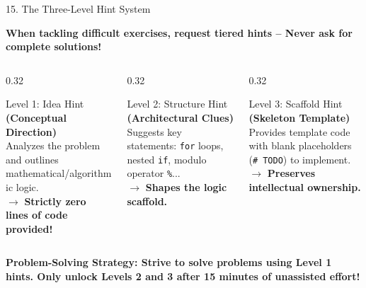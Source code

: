 \documentclass[aspectratio=169, 10pt]{beamer}
\begin{document}
\begin{frame}{15. The Three-Level Hint System}
  \begin{tcolorbox}[colback=primaryblue!8, colframe=primaryblue, arc=3pt, left=6pt, right=6pt, top=2pt, bottom=2pt]
    \centering\footnotesize\bfseries When tackling difficult exercises, request tiered hints -- Never ask for complete solutions!
  \end{tcolorbox}
  \vspace{0.08cm}
  \begin{columns}[T]
    \begin{column}{0.32\textwidth}
      \begin{cbox}[primaryblue]{Level 1: Idea Hint}
        \scriptsize
        \textbf{(Conceptual Direction)}\\[2pt]
        Analyzes the problem and outlines mathematical/algorithmic logic.\\
        \vspace{2pt}
        $\rightarrow$ \textbf{Strictly zero lines of code provided!}
      \end{cbox}
    \end{column}
    \begin{column}{0.32\textwidth}
      \begin{cbox}[secondarygreen]{Level 2: Structure Hint}
        \scriptsize
        \textbf{(Architectural Clues)}\\[2pt]
        Suggests key statements: \texttt{for} loops, nested \texttt{if}, modulo operator \texttt{\%}...\\
        \vspace{2pt}
        $\rightarrow$ \textbf{Shapes the logic scaffold.}
      \end{cbox}
    \end{column}
    \begin{column}{0.32\textwidth}
      \begin{cbox}[accentorange]{Level 3: Scaffold Hint}
        \scriptsize
        \textbf{(Skeleton Template)}\\[2pt]
        Provides template code with blank placeholders (\texttt{\# TODO}) to implement.\\
        \vspace{2pt}
        $\rightarrow$ \textbf{Preserves intellectual ownership.}
      \end{cbox}
    \end{column}
  \end{columns}
  \vspace{0.1cm}
  \begin{tcolorbox}[colback=accentorange!10, colframe=accentorange, arc=3pt, left=6pt, right=6pt, top=2pt, bottom=2pt]
    \centering\scriptsize\bfseries
    Problem-Solving Strategy: Strive to solve problems using Level 1 hints. Only unlock Levels 2 and 3 after 15 minutes of unassisted effort!
  \end{tcolorbox}
\end{frame}
\end{document}
